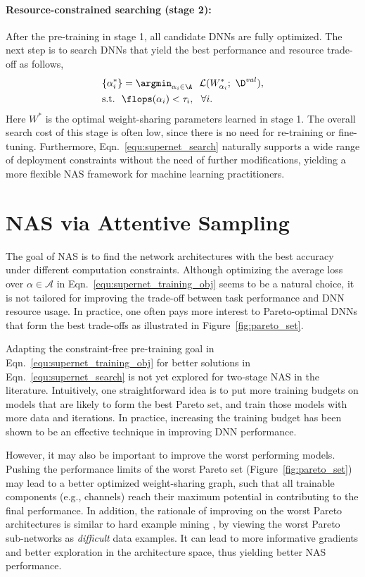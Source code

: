 \documentclass[final]{cvpr}
\theoremstyle{definition}
\begin{document}
\paragraph{Resource-constrained searching (stage 2):}
After the pre-training in stage 1,
all candidate DNNs are fully optimized.
The next step is to search DNNs that yield
the best performance and resource trade-off as follows,
\begin{align}
&\{\alpha_i^*\} = \argmin_{\alpha_i \in \A}~~ \L(W^*_{\alpha_i}; ~\D^{val}),  \label{equ:supernet_search}\\
& \text{s.t.}~~\flops(\alpha_i) < \tau_i, ~~\forall i\nonumber. 
\end{align}
Here $W^*$ is the optimal weight-sharing parameters learned in stage 1. 
The overall search cost of this stage is often low, 
since there is no need for re-training or fine-tuning.  
Furthermore, Eqn.~\eqref{equ:supernet_search} naturally supports a wide range of deployment constraints without the need of further modifications, yielding a more flexible NAS framework for machine learning practitioners. 


 
\section{NAS via Attentive Sampling}
The goal of NAS is to find the network architectures with the best accuracy under different computation constraints.
Although optimizing the average loss over $\alpha \in \mathcal{A}$ in Eqn.~\eqref{equ:supernet_training_obj} seems to be a natural choice,
it is not tailored for improving the trade-off between task performance and DNN resource usage. 
In practice, one often pays more interest to Pareto-optimal DNNs 
that form the best trade-offs as illustrated in Figure~\ref{fig:pareto_set}.

Adapting the constraint-free pre-training goal in Eqn.~\eqref{equ:supernet_training_obj} for better solutions in Eqn.~\eqref{equ:supernet_search} is not yet explored for two-stage NAS in the literature. Intuitively, 
one straightforward idea is to put more training budgets on models that are likely to form the best Pareto set, and train those models with more data and iterations. 
In practice, increasing the training budget has been
shown to be an effective technique in improving DNN performance.

However, it may also be important to improve the worst performing models. 
Pushing the performance limits of the worst {Pareto} set (Figure~\ref{fig:pareto_set}) may lead to a better optimized weight-sharing graph, such that all trainable components (e.g., channels) 
reach their maximum potential in contributing to the final performance. 
In addition, the rationale of improving on the  worst Pareto architectures is similar to hard example mining \cite{shrivastava2016training, smirnov2018hard, suh2019stochastic, jin2018unsupervised}, by viewing the worst {Pareto} sub-networks as \emph{difficult} data examples. 
It can lead to more informative gradients and better exploration in the architecture space, 
thus yielding better NAS performance.
\end{document}

